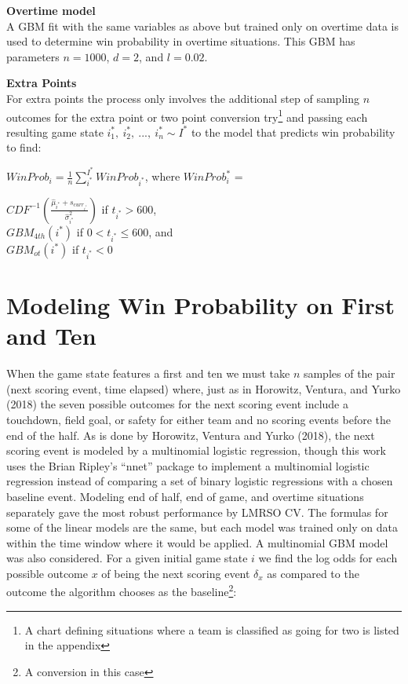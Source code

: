 \documentclass[12pt,twoside]{dukestatscithesis}
\begin{document}
\textbf{Overtime model}\\
A GBM fit with the same variables as above but trained only on overtime data is used to determine win probability in overtime situations. This GBM has parameters \(n = 1000\), \(d = 2\), and \(l = 0.02\).

\textbf{Extra Points}\\
For extra points the process only involves the additional step of sampling \(n\) outcomes for the extra point or two point conversion try\footnote{A chart defining situations where a team is classified as going for two is listed in the appendix} and passing each resulting game state \(i^*_1, \: i^*_2, \:..., \: i^*_n \sim I^*\) to the model that predicts win probability to find:

\(WinProb_i = \frac{1}{n} \sum_{i^*}^{I^*}WinProb_{i^*}\), where \(WinProb_i^*\) =

\(CDF^{-1}(\frac{\hat{\mu}_{i^*} + s_{curr_{i^*}}}{\hat{\sigma}^{2}_{i^*}})\) if \(t_{i^*} > 600\),\\
\(GBM_{4th}(i^*)\) if \(0 <t_{i^*} \leq 600\), and\\
\(GBM_{ot}(i^*)\) if \(t_{i^*} < 0\)

\hypertarget{modeling-win-probability-on-first-and-ten}{%
\section{Modeling Win Probability on First and Ten}\label{modeling-win-probability-on-first-and-ten}}

When the game state features a first and ten we must take \(n\) samples of the pair (next scoring event, time elapsed) where, just as in Horowitz, Ventura, and Yurko (2018) the seven possible outcomes for the next scoring event include a touchdown, field goal, or safety for either team and no scoring events before the end of the half. As is done by Horowitz, Ventura and Yurko (2018), the next scoring event is modeled by a multinomial logistic regression, though this work uses the Brian Ripley's ``nnet'' package to implement a multinomial logistic regression instead of comparing a set of binary logistic regressions with a chosen baseline event. Modeling end of half, end of game, and overtime situations separately gave the most robust performance by LMRSO CV. The formulas for some of the linear models are the same, but each model was trained only on data within the time window where it would be applied. A multinomial GBM model was also considered. For a given initial game state \(i\) we find the log odds for each possible outcome \(x\) of being the next scoring event \(\delta_x\) as compared to the outcome the algorithm chooses as the baseline\footnote{A conversion in this case}:
\end{document}
